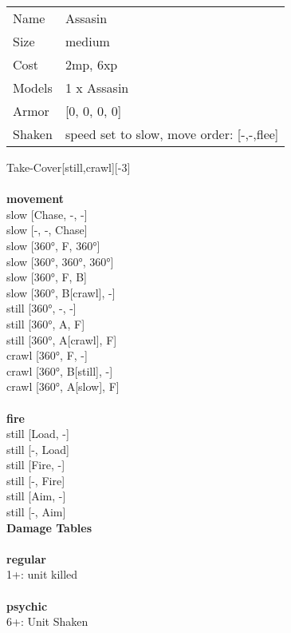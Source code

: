 \begin{tabular}{ll}
  Name & Assasin \\
  Size & medium\\
  Cost & 2mp, 6xp\\
  Models & 1 x Assasin\\
  Armor & [0, 0, 0, 0]\\
  Shaken & speed set to slow, move order: [-,-,flee]\\
\end{tabular}

\noindent Take-Cover[still,crawl][-3]\\ 


\ \\ {\bf movement } \\
slow [Chase, -, -] \\
slow [-, -, Chase] \\
slow [360°, F, 360°] \\
slow [360°, 360°, 360°] \\
slow [360°, F, B] \\
slow [360°, B[crawl], -] \\
still [360°, -, -] \\
still [360°, A, F] \\
still [360°, A[crawl], F] \\
crawl [360°, F, -] \\
crawl [360°, B[still], -] \\
crawl [360°, A[slow], F] \\
\ \\ {\bf fire } \\
still [Load, -] \\
still [-, Load] \\
still [Fire, -] \\
still [-, Fire] \\
still [Aim, -] \\
still [-, Aim] \\


{\bf Damage Tables} \\
\ \\ {\bf regular } \\
1+: unit killed \\
\ \\ {\bf psychic } \\
6+: Unit Shaken \\


